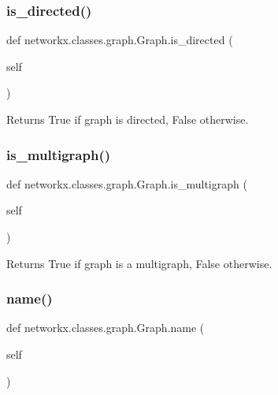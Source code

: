 \subsubsection{\texorpdfstring{is\+\_\+directed()}{is\_directed()}}
{\footnotesize\ttfamily def networkx.\+classes.\+graph.\+Graph.\+is\+\_\+directed (\begin{DoxyParamCaption}\item[{}]{self }\end{DoxyParamCaption})}

\begin{DoxyVerb}Returns True if graph is directed, False otherwise.\end{DoxyVerb}
 \mbox{\label{classnetworkx_1_1classes_1_1graph_1_1Graph_a3c5ee2e371424829d6ac6a47e32b8460}} 
\subsubsection{\texorpdfstring{is\+\_\+multigraph()}{is\_multigraph()}}
{\footnotesize\ttfamily def networkx.\+classes.\+graph.\+Graph.\+is\+\_\+multigraph (\begin{DoxyParamCaption}\item[{}]{self }\end{DoxyParamCaption})}

\begin{DoxyVerb}Returns True if graph is a multigraph, False otherwise.\end{DoxyVerb}
 \mbox{\label{classnetworkx_1_1classes_1_1graph_1_1Graph_a8dd1e8272154babfd15aff6876d0f8f4}} 
\subsubsection{\texorpdfstring{name()}{name()}\hspace{0.1cm}{\footnotesize\ttfamily [1/2]}}
{\footnotesize\ttfamily def networkx.\+classes.\+graph.\+Graph.\+name (\begin{DoxyParamCaption}\item[{}]{self }\end{DoxyParamCaption})}

